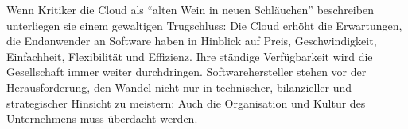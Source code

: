 Wenn Kritiker die Cloud als "`alten Wein in neuen Schläuchen"' 
 beschreiben unterliegen sie einem 
gewaltigen Trugschluss: Die Cloud erhöht die Erwartungen, die Endanwender 
an Software haben in Hinblick auf Preis, Geschwindigkeit, Einfachheit, 
Flexibilität und Effizienz. Ihre ständige Verfügbarkeit wird die Gesellschaft 
immer weiter durchdringen. Softwarehersteller stehen vor der Herausforderung, 
den Wandel nicht nur in technischer, bilanzieller und strategischer Hinsicht zu 
meistern: Auch die Organisation und Kultur des Unternehmens muss überdacht 
werden.
\begin{comment}
Zuletzt fassen Sie Ihre Arbeit kurz zusammen und stellen Ihre wichtigsten 
Schritte, Ergebnisse und Befunde dar. Geben Sie auch einen Ausblick auf mögliche 
anknüpfende Forschungsarbeiten. Außerdem findet sich hier Platz für eine 
kritische Hinterfragung einzelner Teilaspekte und auch für Ihre eigene Meinung.

\subsection{Offene Forschungsfragen}
\begin{itemize}
	\item Wie kann sich ein ISV und ein Softwarebetratungsunternehmen auf 
die strukturellen Änderungen durch die 
Cloud-Migration bei seinen Kunden einstellen?
	\item Die identifizierten Chancen und Risiken hatten Auswirkungen im 
Bereich Visionsentwicklung/Strategie und der Anforderungsermittlung. Wie sind 
die anderen Phasen betroffen.
	\item Einflüsse der Cloud auf Marketing, Strategie und Geschäftsmodell
\end{itemize}

\subsection{Schwierigkeiten}
Trennung zwischen Kundensicht und ISV-Sicht. Siehe Dreieck.




\subsection{Abgabedokument}
\textbf{Abschlussarbeiten} (Bachelor-, Master-, Diplomarbeit) sind in zweifacher 
Ausführung, einseitig bedruckt und gebunden abzugeben. Dazu auf CD die 
Abschlussarbeit in digitaler Form (z.B. Word und PDF), inkl. der 
Endnote-Projektdatei und der Grafiken. 
\end{comment}
